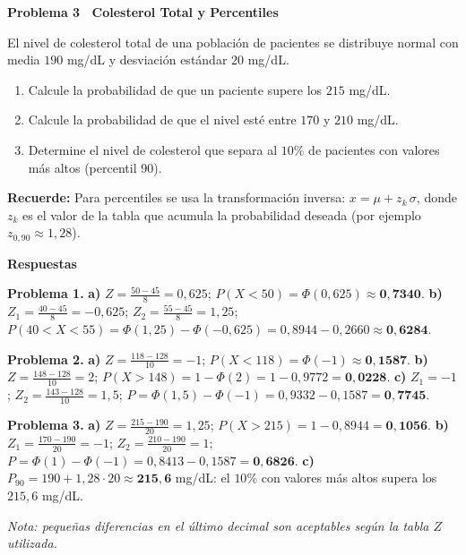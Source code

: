 \documentclass[10pt,letterpaper]{article}
\newcommand{\seccion}[1]{%
  \vspace{2pt}%
  \begin{tcolorbox}[enhanced,colback=white,colframe=black,arc=0pt,boxrule=0pt,
    leftrule=2pt,left=6pt,right=6pt,top=1pt,bottom=1pt]
    {\normalsize\bfseries\sffamily #1}
  \end{tcolorbox}%
  \vspace{1pt}%
}
\newcommand{\reglacaja}[1]{%
  \begin{tcolorbox}[enhanced,colback=white,colframe=black,arc=0pt,boxrule=0.5pt,
    left=6pt,right=6pt,top=2pt,bottom=2pt,breakable]
  \small\sffamily #1
  \end{tcolorbox}%
}
\begin{document}
\seccion{Problema 3 \textendash\ Colesterol Total y Percentiles}

\noindent\sffamily\small El nivel de colesterol total de una poblaci\'on de pacientes se distribuye normal con media $190$ mg/dL y desviaci\'on est\'andar $20$ mg/dL.

\begin{enumerate}[leftmargin=1.2cm, label=\textbf{\alph*)}, itemsep=2pt, topsep=2pt]
  \item Calcule la probabilidad de que un paciente supere los $215$ mg/dL.
  \item Calcule la probabilidad de que el nivel est\'e entre $170$ y $210$ mg/dL.
  \item Determine el nivel de colesterol que separa al $10\%$ de pacientes con valores m\'as altos (percentil 90).
\end{enumerate}

\reglacaja{%
\textbf{Recuerde:} Para percentiles se usa la transformaci\'on inversa: $x = \mu + z_k\,\sigma$, donde $z_k$ es el valor de la tabla que acumula la probabilidad deseada (por ejemplo $z_{0{,}90}\approx1{,}28$).%
}

\newpage

\seccion{Respuestas}

\small\sffamily
\textbf{Problema 1.}
\textbf{a)} $Z=\frac{50-45}{8}=0{,}625$; $P(X<50)=\Phi(0{,}625)\approx\mathbf{0{,}7340}$.
\textbf{b)} $Z_1=\frac{40-45}{8}=-0{,}625$; $Z_2=\frac{55-45}{8}=1{,}25$; $P(40<X<55)=\Phi(1{,}25)-\Phi(-0{,}625)=0{,}8944-0{,}2660\approx\mathbf{0{,}6284}$.

\medskip
\textbf{Problema 2.}
\textbf{a)} $Z=\frac{118-128}{10}=-1$; $P(X<118)=\Phi(-1)\approx\mathbf{0{,}1587}$.
\textbf{b)} $Z=\frac{148-128}{10}=2$; $P(X>148)=1-\Phi(2)=1-0{,}9772=\mathbf{0{,}0228}$.
\textbf{c)} $Z_1=-1$; $Z_2=\frac{143-128}{10}=1{,}5$; $P=\Phi(1{,}5)-\Phi(-1)=0{,}9332-0{,}1587=\mathbf{0{,}7745}$.

\medskip
\textbf{Problema 3.}
\textbf{a)} $Z=\frac{215-190}{20}=1{,}25$; $P(X>215)=1-0{,}8944=\mathbf{0{,}1056}$.
\textbf{b)} $Z_1=\frac{170-190}{20}=-1$; $Z_2=\frac{210-190}{20}=1$; $P=\Phi(1)-\Phi(-1)=0{,}8413-0{,}1587=\mathbf{0{,}6826}$.
\textbf{c)} $P_{90}=190+1{,}28\cdot20\approx\mathbf{215{,}6}$ mg/dL: el $10\%$ con valores m\'as altos supera los $215{,}6$ mg/dL.

\medskip
\textit{Nota: peque\~nas diferencias en el \'ultimo decimal son aceptables seg\'un la tabla $Z$ utilizada.}
\end{document}
